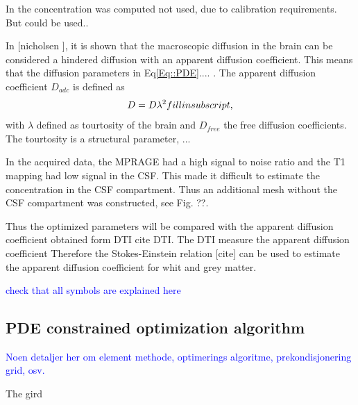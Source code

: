 \documentclass[11pt,a4paper]{article}
\newcommand{\kam}[1]{\textcolor{blue}{#1}}
\begin{document}
In \cite{XU2011827} the concentration was computed {\color{red} not used, due to calibration requirements. But could be used.}. 

In [nicholsen ], it is shown that the macroscopic diffusion in the brain can be considered a hindered diffusion with an apparent diffusion coefficient. This means that the diffusion parameters in Eq\ref{Eq::PDE}.... . The apparent diffusion coefficient  $D_{adc}$ is defined as 
\begin{equation}
D = D \lambda\sp{2} fill in subscript,
\end{equation} 
with $\lambda$ defined as tourtosity of the brain and $D_{free}$ the free diffusion coefficients.  The tourtosity is a structural parameter, ...


In the acquired data, the MPRAGE had a high signal to noise ratio and the T1 mapping had low signal in the CSF. This made it difficult to estimate the concentration in the CSF compartment. Thus an additional mesh without the CSF compartment was constructed, see Fig. ??.     


Thus the optimized parameters will be compared with the apparent diffusion coefficient obtained form DTI cite DTI. The DTI measure the apparent diffusion coefficient 
Therefore the Stokes-Einstein relation [cite] can be used to estimate the apparent diffusion coefficient for whit and grey matter. 
 

  





\kam{check that all symbols are explained here}






\subsection{PDE constrained optimization algorithm} 

\kam{
Noen detaljer her om element methode, optimerings algoritme, prekondisjonering
grid, osv. 
}


The gird 
\end{document}
